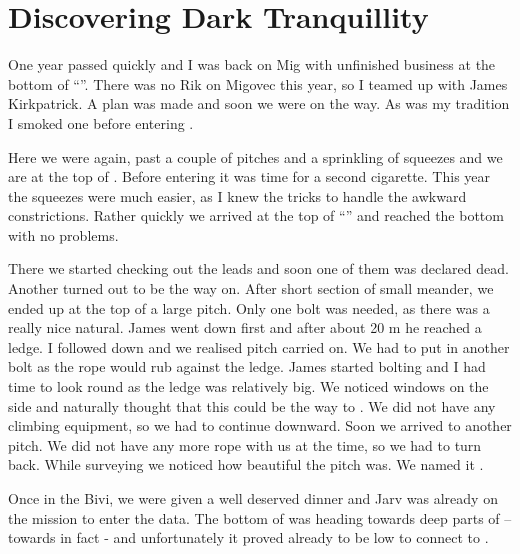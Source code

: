 \section{Discovering Dark Tranquillity}


One year passed quickly and I was back on Mig with unfinished business
at the bottom of ``''. There was no Rik on Migovec
this year, so I teamed up with James Kirkpatrick. A plan was made and
soon we were on the way. As was my tradition I smoked one before
entering .

Here we were again, past a couple of pitches and a sprinkling of
squeezes and we are at the top of . Before entering
 it was time for a second cigarette. This year
the squeezes were much easier, as I knew the tricks to handle the
awkward constrictions. Rather quickly we arrived at the top of
``'' and reached the bottom with no problems.

There we started checking out the leads and soon one of them was
declared dead. Another turned out to be the way on. After short section
of small meander, we ended up at the top of a large pitch. Only one bolt
was needed, as there was a really nice natural. James went down first
and after about 20 m he reached a ledge. I followed down and we realised
pitch carried on. We had to put in another bolt as the rope would rub
against the ledge. James started bolting and I had time to look round as
the ledge was relatively big. We noticed windows on the side and
naturally thought that this could be the way to . We did not
have any climbing equipment, so we had to continue downward. Soon we
arrived to another pitch. We did not have any more rope with us at the
time, so we had to turn back. While surveying we noticed how beautiful
the pitch was. We named it .

Once in the Bivi, we were given a well deserved dinner and Jarv was
already on the mission to enter the data. The bottom of  was heading towards deep parts of  --
towards  in fact - and unfortunately it proved
already to be low to connect to .

